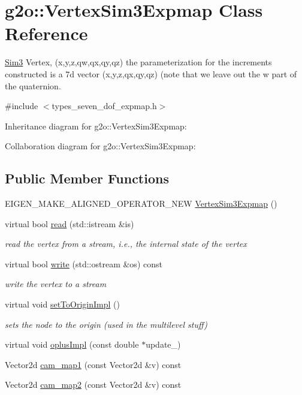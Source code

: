 \hypertarget{classg2o_1_1VertexSim3Expmap}{}\section{g2o\+:\+:Vertex\+Sim3\+Expmap Class Reference}
\label{classg2o_1_1VertexSim3Expmap}


\hyperlink{structg2o_1_1Sim3}{Sim3} Vertex, (x,y,z,qw,qx,qy,qz) the parameterization for the increments constructed is a 7d vector (x,y,z,qx,qy,qz) (note that we leave out the w part of the quaternion.  




{\ttfamily \#include $<$types\+\_\+seven\+\_\+dof\+\_\+expmap.\+h$>$}



Inheritance diagram for g2o\+:\+:Vertex\+Sim3\+Expmap\+:


Collaboration diagram for g2o\+:\+:Vertex\+Sim3\+Expmap\+:
\subsection*{Public Member Functions}
\begin{DoxyCompactItemize}
\item 
E\+I\+G\+E\+N\+\_\+\+M\+A\+K\+E\+\_\+\+A\+L\+I\+G\+N\+E\+D\+\_\+\+O\+P\+E\+R\+A\+T\+O\+R\+\_\+\+N\+EW \hyperlink{classg2o_1_1VertexSim3Expmap_ac1f5a851bf896518998d8186723af365}{Vertex\+Sim3\+Expmap} ()
\item 
virtual bool \hyperlink{classg2o_1_1VertexSim3Expmap_a16b4ef216ad1c4709a6fc6aa452d8e61}{read} (std\+::istream \&is)
\begin{DoxyCompactList}\small\item\em read the vertex from a stream, i.\+e., the internal state of the vertex \end{DoxyCompactList}\item 
virtual bool \hyperlink{classg2o_1_1VertexSim3Expmap_afdc6079061312466de17b7493e4c491a}{write} (std\+::ostream \&os) const 
\begin{DoxyCompactList}\small\item\em write the vertex to a stream \end{DoxyCompactList}\item 
virtual void \hyperlink{classg2o_1_1VertexSim3Expmap_ab076d5964ab55f95251a75bcf341ce05}{set\+To\+Origin\+Impl} ()
\begin{DoxyCompactList}\small\item\em sets the node to the origin (used in the multilevel stuff) \end{DoxyCompactList}\item 
virtual void \hyperlink{classg2o_1_1VertexSim3Expmap_abef7e4d10825caa129984f69251508c2}{oplus\+Impl} (const double $\ast$update\+\_\+)
\item 
Vector2d \hyperlink{classg2o_1_1VertexSim3Expmap_a6ca0c90f25fcde9ab38881b100bab6bc}{cam\+\_\+map1} (const Vector2d \&v) const 
\item 
Vector2d \hyperlink{classg2o_1_1VertexSim3Expmap_a4841c2bbe7b883be30f74b50e078b42e}{cam\+\_\+map2} (const Vector2d \&v) const 
\end{DoxyCompactItemize}
